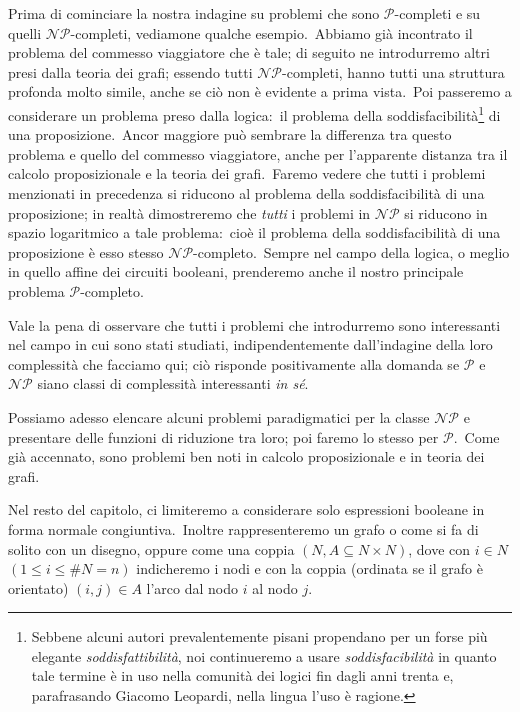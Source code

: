 Prima di cominciare la nostra indagine su problemi che sono $\mathcal{P}$-completi e su quelli $\mathcal{NP}$-completi, vediamone qualche esempio.\
Abbiamo già incontrato il problema del commesso viaggiatore che è tale; di seguito ne introdurremo altri presi dalla teoria dei grafi; essendo tutti $\mathcal{NP}$-completi, hanno tutti una struttura profonda molto simile, anche se ciò non è evidente a prima vista.\
Poi passeremo a considerare un problema preso dalla logica:\ il problema della soddisfacibilità\footnote{Sebbene alcuni autori prevalentemente pisani propendano per un forse più elegante \textit{soddisfattibilità}, noi continueremo a usare \textit{soddisfacibilità} in quanto tale termine è in uso nella comunità dei logici fin dagli anni trenta e, parafrasando Giacomo Leopardi, nella lingua l'uso è ragione.} di una proposizione.\
Ancor maggiore può sembrare la differenza tra questo problema e quello del commesso viaggiatore, anche per l'apparente distanza tra il calcolo proposizionale e la teoria dei grafi.\
Faremo vedere che tutti i problemi menzionati in precedenza si riducono al problema della soddisfacibilità di una proposizione; in realtà dimostreremo che \textit{tutti} i problemi in $\mathcal{NP}$ si riducono in spazio logaritmico a tale problema:\ cioè il problema della soddisfacibilità di una proposizione è esso stesso $\mathcal{NP}$-completo.\
Sempre nel campo della logica, o meglio in quello affine dei circuiti booleani, prenderemo anche il nostro principale problema $\mathcal{P}$-completo.\

Vale la pena di osservare che tutti i problemi che introdurremo sono interessanti nel campo in cui sono stati studiati, indipendentemente dall'indagine della loro complessità che facciamo qui; ciò risponde positivamente alla domanda se $\mathcal{P}$ e $\mathcal{NP}$ siano classi di complessità interessanti \textit{in sé}.\

Possiamo adesso elencare alcuni problemi paradigmatici per la classe $\mathcal{NP}$ e presentare delle funzioni di riduzione tra loro; poi faremo lo stesso per $\mathcal{P}$.\
Come già accennato, sono problemi ben noti in calcolo proposizionale e in teoria dei grafi.\

Nel resto del capitolo, ci limiteremo a considerare solo espressioni booleane in forma normale congiuntiva.\
Inoltre rappresenteremo un grafo o come si fa di solito con un disegno, oppure come una coppia $(N, A \subseteq N \times N)$, dove con $i \in N$ $(1 \leq i \leq \#N = n)$ indicheremo i nodi e con la coppia (ordinata se il grafo è orientato) $(i, j) \in A$ l'arco dal nodo $i$ al nodo $j$.

